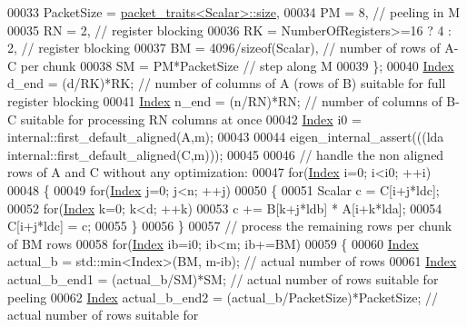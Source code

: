 \begin{DoxyCode}
00033     PacketSize = \hyperlink{struct_eigen_1_1internal_1_1packet__traits}{packet\_traits<Scalar>::size},
00034     PM = 8,                             \textcolor{comment}{// peeling in M}
00035     RN = 2,                             \textcolor{comment}{// register blocking}
00036     RK = NumberOfRegisters>=16 ? 4 : 2, \textcolor{comment}{// register blocking}
00037     BM = 4096/\textcolor{keyword}{sizeof}(Scalar),           \textcolor{comment}{// number of rows of A-C per chunk}
00038     SM = PM*PacketSize                  \textcolor{comment}{// step along M}
00039   \};
00040   \hyperlink{namespace_eigen_a62e77e0933482dafde8fe197d9a2cfde}{Index} d\_end = (d/RK)*RK;    \textcolor{comment}{// number of columns of A (rows of B) suitable for full register
       blocking}
00041   \hyperlink{namespace_eigen_a62e77e0933482dafde8fe197d9a2cfde}{Index} n\_end = (n/RN)*RN;    \textcolor{comment}{// number of columns of B-C suitable for processing RN columns at once}
00042   \hyperlink{namespace_eigen_a62e77e0933482dafde8fe197d9a2cfde}{Index} i0 = internal::first\_default\_aligned(A,m);
00043   
00044   eigen\_internal\_assert(((lda%
      internal::first\_default\_aligned(C,m)));
00045   
00046   \textcolor{comment}{// handle the non aligned rows of A and C without any optimization:}
00047   \textcolor{keywordflow}{for}(\hyperlink{namespace_eigen_a62e77e0933482dafde8fe197d9a2cfde}{Index} i=0; i<i0; ++i)
00048   \{
00049     \textcolor{keywordflow}{for}(\hyperlink{namespace_eigen_a62e77e0933482dafde8fe197d9a2cfde}{Index} j=0; j<n; ++j)
00050     \{
00051       Scalar c = C[i+j*ldc];
00052       \textcolor{keywordflow}{for}(\hyperlink{namespace_eigen_a62e77e0933482dafde8fe197d9a2cfde}{Index} k=0; k<d; ++k)
00053         c += B[k+j*ldb] * A[i+k*lda];
00054       C[i+j*ldc] = c;
00055     \}
00056   \}
00057   \textcolor{comment}{// process the remaining rows per chunk of BM rows}
00058   \textcolor{keywordflow}{for}(\hyperlink{namespace_eigen_a62e77e0933482dafde8fe197d9a2cfde}{Index} ib=i0; ib<m; ib+=BM)
00059   \{
00060     \hyperlink{namespace_eigen_a62e77e0933482dafde8fe197d9a2cfde}{Index} actual\_b = std::min<Index>(BM, m-ib);                 \textcolor{comment}{// actual number of rows}
00061     \hyperlink{namespace_eigen_a62e77e0933482dafde8fe197d9a2cfde}{Index} actual\_b\_end1 = (actual\_b/SM)*SM;                   \textcolor{comment}{// actual number of rows suitable for
       peeling}
00062     \hyperlink{namespace_eigen_a62e77e0933482dafde8fe197d9a2cfde}{Index} actual\_b\_end2 = (actual\_b/PacketSize)*PacketSize;   \textcolor{comment}{// actual number of rows suitable for
}
\end{DoxyCode}
